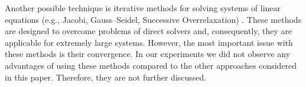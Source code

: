Another possible technique is iterative methods for solving systems of linear equations (e.g., Jacobi, Gauss--Seidel, Successive Overrelaxation) \cite{press2007}. These methods are designed to overcome problems of direct solvers and, consequently, they are applicable for extremely large systems. However, the most important issue with these methods is their convergence. In our experiments we did not observe any advantages of using these methods compared to the other approaches considered in this paper. Therefore, they are not further discussed.
